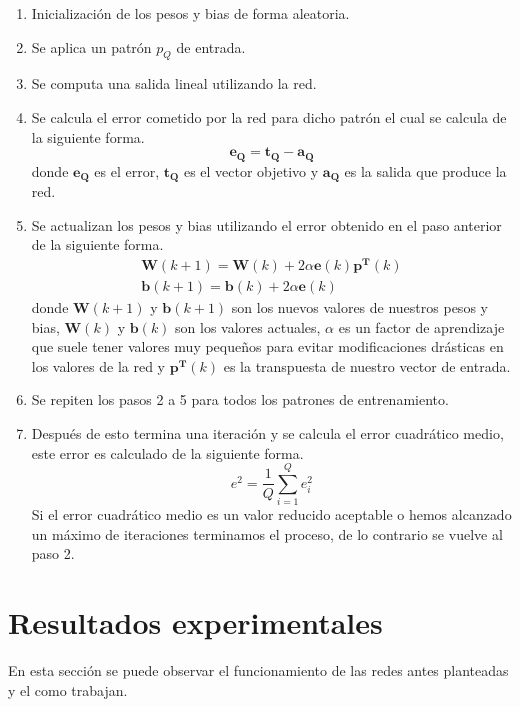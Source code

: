 \documentclass[12pt, titlepage]{article}
\begin{document}
        \begin{enumerate}
            \item Inicialización de los pesos y bias de forma aleatoria.
            \item Se aplica un patrón $p_Q$ de entrada.
            \item Se computa una salida lineal utilizando la red.
            \item Se calcula el error cometido por la red para dicho patrón el cual se calcula de la siguiente forma.
            \[\boldsymbol{e_Q = t_Q - a_Q} \]
            donde $\boldsymbol{e_Q}$ es el error, $\boldsymbol{t_Q}$ es el vector objetivo y $\boldsymbol{a_Q}$ es la salida que produce la red.
            \item Se actualizan los pesos y bias utilizando el error obtenido en el paso anterior de la siguiente forma.
            \begin{gather*}
            \boldsymbol{W}(k+1) = \boldsymbol{W}(k) +2\alpha \boldsymbol{e}(k)\boldsymbol{p^T}(k) \\
            \boldsymbol{b}(k+1) =\boldsymbol{b}(k) + 2\alpha \boldsymbol{e}(k)
            \end{gather*}
            donde $\boldsymbol{W}(k+1)$ y $\boldsymbol{b}(k+1)$ son los nuevos valores de nuestros pesos y bias, $\boldsymbol{W}(k)$ y $\boldsymbol{b}(k)$ son los valores actuales, $\alpha$ es un factor de aprendizaje que suele tener valores muy pequeños para evitar modificaciones drásticas en los valores de la red y $\boldsymbol{p^T}(k)$ es la transpuesta de nuestro vector de entrada.
            \item Se repiten los pasos 2 a 5 para todos los patrones de entrenamiento.
            \item Después de esto termina una iteración y se calcula el error cuadrático medio, este error es calculado de la siguiente forma.
            \[ e^2 = \frac{1}{Q} \sum _{i=1}^{Q} e^2_i \]
            Si el error cuadrático medio es un valor reducido aceptable o hemos alcanzado un máximo de iteraciones terminamos el proceso, de lo contrario se vuelve al paso 2.
        \end{enumerate}
    \newpage
    \section{Resultados experimentales}
    En esta sección se puede observar el funcionamiento de las redes antes planteadas y el como trabajan.
\end{document}
